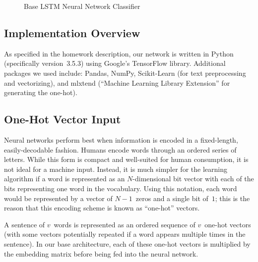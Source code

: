 \documentclass{report}
\begin{document}
\begin{figure}
    \caption{Base LSTM Neural Network Classifier}\label{fig:completeLstmClassifer}
  \end{figure}
  
  
  
  \subsection{Implementation Overview}\label{sec:implementation}
  
  As specified in the homework description, our network is written in Python (specifically version~3.5.3) using Google's TensorFlow library.  Additional packages we used include: Pandas, NumPy, Scikit-Learn (for text preprocessing and vectorizing), and mlxtend (``Machine Learning Library Extension'' for generating the one-hot). 
  
  \subsection{One-Hot Vector Input}\label{sec:oneHotVector}
  
  Neural networks perform best when information is encoded in a fixed-length, easily-decodable fashion.  Humans encode words through an ordered series of letters.  While this form is compact and well-suited for human consumption, it is not ideal for a machine input.  Instead, it is much simpler for the learning algorithm if a word is represented as an $N$-dimensional bit vector with each of the bits representing one word in the vocabulary.  Using this notation, each word would be represented by a vector of $N-1$~zeros and a single bit of~$1$; this is the reason that this encoding scheme is known as ``one-hot'' vectors.  
  
  A sentence of $v$~words is represented as an ordered sequence of $v$~one-hot vectors (with some vectors potentially repeated if a word appears multiple times in the sentence).  In our base architecture, each of these one-hot vectors is multiplied by the embedding matrix before being fed into the neural network.
  
\end{document}
